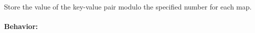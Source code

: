 Store the value of the key-value pair modulo the specified number for each map.

\paragraph{Behavior:}
\begin{itemize}[noitemsep]


\end{itemize}
